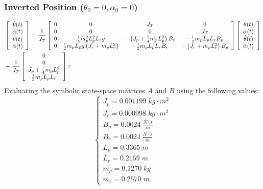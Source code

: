 \subsubsection*{Inverted Position (\( \theta_0=0, \alpha_0=0 \))}
\begin{align*}
     & \left[\begin{array}{c}
            \dot{\theta}(t)  \\
            \dot{\alpha}(t)  \\
            \ddot{\theta}(t) \\
            \ddot{\alpha}(t)
        \end{array}\right] = \frac{1}{J_T}
    \left[\begin{array}{c c c c}
            0 & 0                                                    & J_T                                            & 0                                  \\
            0 & 0                                                    & 0                                              & J_T                                \\
            0 & \frac{1}{4} m_{p}^2 L_{p}^2 L_r g                    & -\left(J_p + \frac{1}{4} m_p L_{p}^2\right)B_r & -\frac{1}{2} m_p L_p L_r B_p       \\
            0 & \frac{1}{2} m_p L_p g \left(J_r + m_p L_{r}^2\right) & -\frac{1}{2} m_p L_p L_r B_r                   & -\left(J_r + m_p L_{r}^2\right)B_p
        \end{array}\right]
    \left[\begin{array}{c}
            \theta(t)       \\
            \alpha(t)       \\
            \dot{\theta}(t) \\
            \dot{\alpha}(t)
        \end{array}\right]                    \\
     & + \frac{1}{J_T}
    \left[\begin{array}{c}
            0                             \\
            0                             \\
            J_p + \frac{1}{4} m_p L_{p}^2 \\
            \frac{1}{2} m_p L_p L_r
        \end{array}\right] \tau
\end{align*}
Evaluating the symbolic state-space matrices $A$ and $B$ using the following values:
\[
    \begin{cases}
        J_p = 0.001199 \; kg \cdot m^2     \\
        J_r = 0.000998 \; kg \cdot m^2     \\
        B_p = 0.0024 \; \frac{N\cdot s}{m} \\
        B_r = 0.0024 \; \frac{N\cdot s}{m} \\
        L_p = 0.3365 \; m                  \\
        L_r = 0.2159 \; m                  \\
        m_p = 0.1270 \; kg                 \\
        m_r = 0.2570 \; m.
    \end{cases}
\]

